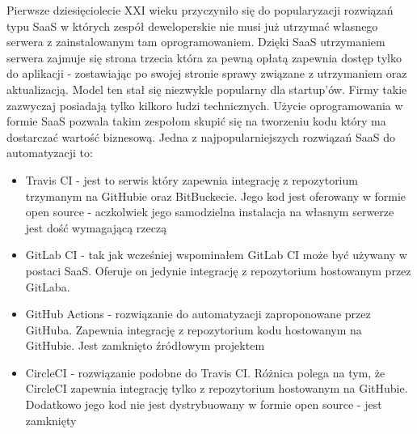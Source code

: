 Pierwsze dziesięciolecie XXI wieku przyczyniło się do popularyzacji rozwiązań typu SaaS w których zespół deweloperskie nie musi już utrzymać własnego serwera z zainstalowanym tam oprogramowaniem. Dzięki SaaS utrzymaniem serwera zajmuje się strona trzecia która za pewną opłatą zapewnia dostęp tylko do aplikacji - zostawiając po swojej stronie sprawy związane z utrzymaniem oraz aktualizacją. Model ten stał się niezwykle popularny dla startup'ów. Firmy takie zazwyczaj posiadają tylko kilkoro ludzi technicznych. Użycie oprogramowania w formie SaaS pozwala takim zespołom skupić się na tworzeniu kodu który ma dostarczać wartość biznesową. Jedna z najpopularniejszych rozwiązań SaaS do automatyzacji to:
\begin{itemize}
    \item Travis CI - jest to serwis który zapewnia integrację z repozytorium trzymanym na GitHubie oraz BitBuckecie. Jego kod jest oferowany w formie open source - aczkolwiek jego samodzielna instalacja na własnym serwerze jest dość wymagającą rzeczą \cite{TravisCI}
    \item GitLab CI - tak jak wcześniej wspominałem GitLab CI może być używany w postaci SaaS. Oferuje on jedynie integrację z repozytorium hostowanym przez GitLaba.
    \item GitHub Actions - rozwiązanie do automatyzacji zaproponowane przez GitHuba. Zapewnia integrację z repozytorium kodu hostowanym na GitHubie. Jest zamknięto źródłowym projektem
    \item CircleCI - rozwiązanie podobne do Travis CI. Różnica polega na tym, że CircleCI zapewnia integrację tylko z repozytorium hostowanym na GitHubie. Dodatkowo jego kod nie jest dystrybuowany w formie open source - jest zamknięty 
\end{itemize}
